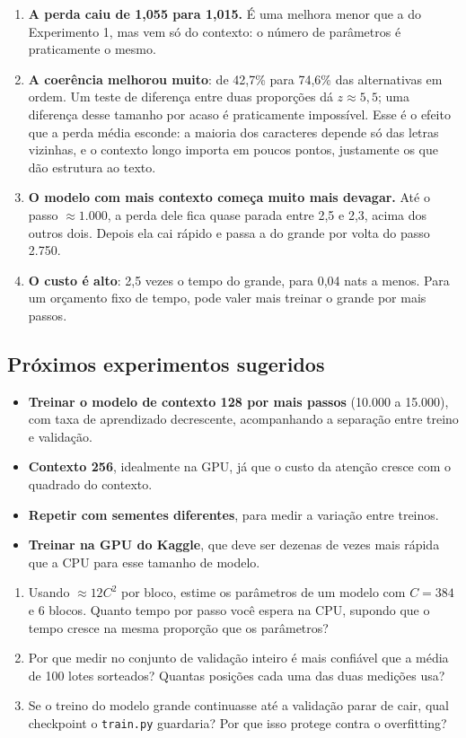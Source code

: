 \begin{enumerate}
\item \textbf{A perda caiu de 1,055 para 1,015.} É uma melhora menor que a do Experimento 1, mas vem só do contexto: o número de parâmetros é praticamente o mesmo.
\item \textbf{A coerência melhorou muito}: de 42,7\% para 74,6\% das alternativas em ordem. Um teste de diferença entre duas proporções dá $z \approx 5{,}5$; uma diferença desse tamanho por acaso é praticamente impossível. Esse é o efeito que a perda média esconde: a maioria dos caracteres depende só das letras vizinhas, e o contexto longo importa em poucos pontos, justamente os que dão estrutura ao texto.
\item \textbf{O modelo com mais contexto começa muito mais devagar.} Até o passo $\approx 1.000$, a perda dele fica quase parada entre 2,5 e 2,3, acima dos outros dois. Depois ela cai rápido e passa a do grande por volta do passo 2.750.
\item \textbf{O custo é alto}: 2,5 vezes o tempo do grande, para 0,04 nats a menos. Para um orçamento fixo de tempo, pode valer mais treinar o grande por mais passos.
\end{enumerate}

\subsection{Próximos experimentos sugeridos}

\begin{itemize}
\item \textbf{Treinar o modelo de contexto 128 por mais passos} (10.000 a 15.000), com taxa de aprendizado decrescente, acompanhando a separação entre treino e validação.
\item \textbf{Contexto 256}, idealmente na GPU, já que o custo da atenção cresce com o quadrado do contexto.
\item \textbf{Repetir com sementes diferentes}, para medir a variação entre treinos.
\item \textbf{Treinar na GPU do Kaggle}, que deve ser dezenas de vezes mais rápida que a CPU para esse tamanho de modelo.
\end{itemize}

\begin{exercicios}
\begin{enumerate}
\item Usando $\approx 12C^2$ por bloco, estime os parâmetros de um modelo com $C=384$ e 6 blocos. Quanto tempo por passo você espera na CPU, supondo que o tempo cresce na mesma proporção que os parâmetros?
\item Por que medir no conjunto de validação inteiro é mais confiável que a média de 100 lotes sorteados? Quantas posições cada uma das duas medições usa?
\item Se o treino do modelo grande continuasse até a validação parar de cair, qual checkpoint o \texttt{train.py} guardaria? Por que isso protege contra o overfitting?
\end{enumerate}
\end{exercicios}
